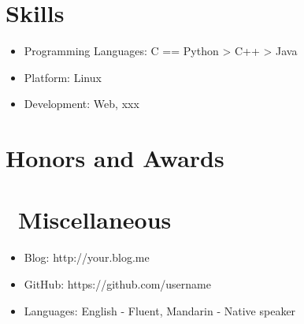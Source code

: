 \documentclass{resume}
\begin{document}

\section{Skills}
\begin{itemize}[parsep=0.5ex]
  \item Programming Languages: C == Python > C++ > Java
  \item Platform: Linux
  \item Development: Web, xxx
\end{itemize}

\section{Honors and Awards}

\section{\faInfo\ Miscellaneous}
\begin{itemize}[parsep=0.5ex]
  \item Blog: http://your.blog.me
  \item GitHub: https://github.com/username
  \item Languages: English - Fluent, Mandarin - Native speaker
\end{itemize}

%
%
\end{document}
